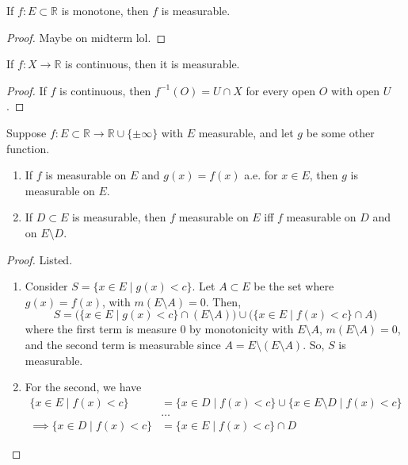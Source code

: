   \begin{theorem} 
    If $f: E \subset \mathbb{R}$ is monotone, then $f$ is measurable.
  \end{theorem}
  \begin{proof}
    Maybe on midterm lol. 
  \end{proof}

  \begin{theorem}
    If $f: X \to \mathbb{R}$ is continuous, then it is measurable. 
  \end{theorem}
  \begin{proof}
    If $f$ is continuous, then $f^{-1} (O) = U \cap X$ for every open $O$ with open $U$. 
  \end{proof}

  \begin{theorem}
    Suppose $f: E \subset \mathbb{R} \to \mathbb{R} \cup \{\pm \infty\}$ with $E$ measurable, and let $g$ be some other function. 
    \begin{enumerate}
      \item If $f$ is measurable on $E$ and $g(x) = f(x)$ a.e. for $x \in E$, then $g$ is measurable on $E$. 
      \item If $D \subset E$ is measurable, then $f$ measurable on $E$ iff $f$ measurable on $D$ and on $E \setminus D$. 
    \end{enumerate}
  \end{theorem}
  \begin{proof}
    Listed. 
    \begin{enumerate}
      \item Consider $S = \{x \in E \mid g(x) < c \}$. Let $A \subset E$ be the set where $g(x) = f(x)$, with $m (E \setminus A) = 0$. Then, 
      \begin{equation}
        S = \big( \{x \in E \mid g(x) < c\} \cap (E \setminus A) \big) \cup \big( \{x \in E \mid f(x) < c\} \cap A \big) 
      \end{equation}
      where the first term is measure $0$ by monotonicity with $E \setminus A$, $m(E \setminus A) = 0$, and the second term is measurable since $A = E \setminus (E \setminus A)$. So, $S$ is measurable. 

      \item For the second, we have 
      \begin{align}
        \{ x \in E \mid f(x) < c \} & = \{x \in D \mid f(x) < c\} \cup \{ x \in E \setminus D \mid f(x) < c \} \\ 
                                    & \ldots \\  
        \implies \{x \in D \mid f(x) < c\} & = \{x \in E \mid f(x) < c \} \cap D
      \end{align}

    \end{enumerate}
  \end{proof}
  
